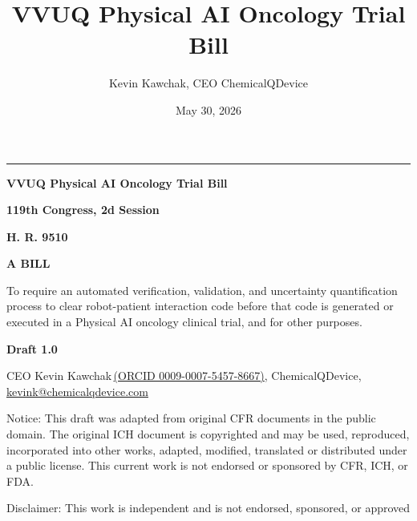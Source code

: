 \documentclass[11pt]{article}
\title{VVUQ Physical AI Oncology Trial Bill}
\author{Kevin Kawchak, CEO ChemicalQDevice}
\date{May 30, 2026}
\begin{document}
\begin{titlepage}
\centering
\vspace*{1.1cm}
{\color{billnavy}\rule{\textwidth}{3pt}}\par
\vspace{0.8cm}
{\LARGE\bfseries\sffamily\color{billnavy} VVUQ Physical AI Oncology Trial Bill\par}
\vspace{0.5cm}
{\large\bfseries\sffamily\color{billnavy} 119th Congress, 2d Session\par}
\vspace{0.18cm}
{\Large\bfseries H. R. 9510\par}
\vspace{0.35cm}
{\large\bfseries A BILL\par}
\vspace{0.25cm}
\begin{minipage}{0.86\textwidth}
\centering\small
To require an automated verification, validation, and uncertainty
quantification process to clear robot-patient interaction code before that code
is generated or executed in a Physical AI oncology clinical trial, and for other
purposes.
\end{minipage}\par
\vspace{0.6cm}
{\large\bfseries Draft 1.0\par}
\vspace{0.6cm}
{\normalsize CEO Kevin Kawchak\,\href{https://orcid.org/0009-0007-5457-8667}{(ORCID 0009-0007-5457-8667)}, ChemicalQDevice, \href{mailto:kevink@chemicalqdevice.com}{kevink@chemicalqdevice.com}\par}
\vspace{0.9cm}
\begin{minipage}{0.86\textwidth}
\small\raggedright
Notice: This draft was adapted from original CFR documents in the public domain.
The original ICH document is copyrighted and may be used, reproduced,
incorporated into other works, adapted, modified, translated or distributed
under a public license. This current work is not endorsed or sponsored by CFR,
ICH, or FDA.
\par\vspace{\baselineskip}
Disclaimer: This work is independent and is not endorsed, sponsored, or approved

\end{minipage}
\end{titlepage}
\end{document}
